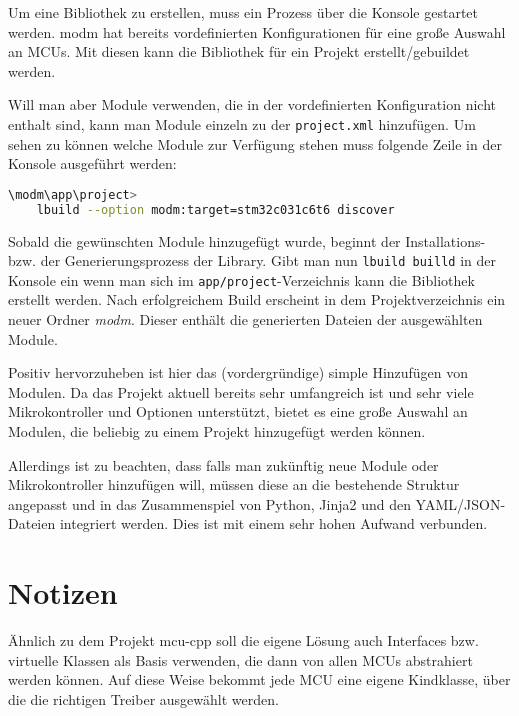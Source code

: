 Um eine Bibliothek zu erstellen, muss ein Prozess über die Konsole gestartet werden.
modm hat bereits vordefinierten Konfigurationen für eine große Auswahl an MCUs.
Mit diesen kann die Bibliothek für ein Projekt erstellt/gebuildet werden.

Will man aber Module verwenden, die in der vordefinierten Konfiguration nicht enthalt sind, kann man Module einzeln zu der \texttt{project.xml} hinzufügen.
Um sehen zu können welche Module zur Verfügung stehen muss folgende Zeile in der Konsole ausgeführt werden:

\vspace{3mm}
\begin{lstlisting}[language=bash, caption={Konsolenbefehl um verf\"ugbare Module aufgelistet zu bekommen; hier f\"ur den STM32C031C6T6 Mikrokontroller.}, label={lst:modm_lbild_discover}]
\modm\app\project>
	lbuild --option modm:target=stm32c031c6t6 discover
\end{lstlisting}

Sobald die gewünschten Module hinzugefügt wurde, beginnt der Installations- bzw. der Generierungsprozess der Library. 
Gibt man nun \texttt{lbuild builld} in der Konsole ein wenn man sich im \texttt{app/project}-Verzeichnis kann die Bibliothek erstellt werden.
Nach erfolgreichem Build erscheint in dem Projektverzeichnis ein neuer Ordner \emph{modm}.
Dieser enthält die generierten Dateien der ausgewählten Module.

Positiv hervorzuheben ist hier das (vordergründige) simple Hinzufügen von Modulen.
Da das Projekt aktuell bereits sehr umfangreich ist und sehr viele Mikrokontroller und Optionen unterstützt, bietet es eine große Auswahl an Modulen, die beliebig zu einem Projekt hinzugefügt werden können.

Allerdings ist zu beachten, dass falls man zukünftig neue Module oder Mikrokontroller hinzufügen will, müssen diese an die bestehende Struktur angepasst und in das Zusammenspiel von Python, Jinja2 und den YAML/JSON-Dateien integriert werden.
Dies ist mit einem sehr hohen Aufwand verbunden.


\section{Notizen}
Ähnlich zu dem Projekt mcu-cpp soll die eigene Lösung auch Interfaces bzw. virtuelle Klassen als Basis verwenden, die dann von allen MCUs abstrahiert werden können.
Auf diese Weise bekommt jede MCU eine eigene Kindklasse, über die die richtigen Treiber ausgewählt werden.



